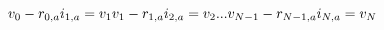 \documentclass[10pt]{article}
\begin{document}
\[\hspace{-15pt}v_0 - r_{0,a} i_{1,a} = v_{1} \\
v_1 - r_{1,a} i_{2,a} = v_{2} \\
...\\
v_{N-1} - r_{N-1,a} i_{N,a} = v_{N} \\
\]
\end{document}
